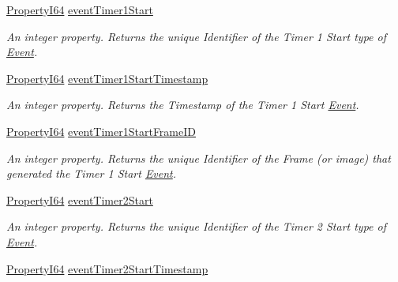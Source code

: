 \begin{DoxyCompactItemize}
\hyperlink{group___common_interface_ga81749b2696755513663492664a18a893}{Property\+I64} \hyperlink{classmv_i_m_p_a_c_t_1_1acquire_1_1_gen_i_cam_1_1_event_control_aa4a2c6fdc4028c75cc5c03682c9f6fad}{event\+Timer1\+Start}
\begin{DoxyCompactList}\small\item\em An integer property. Returns the unique Identifier of the Timer 1 Start type of \hyperlink{classmv_i_m_p_a_c_t_1_1acquire_1_1_event}{Event}. \end{DoxyCompactList}\item 
\hyperlink{group___common_interface_ga81749b2696755513663492664a18a893}{Property\+I64} \hyperlink{classmv_i_m_p_a_c_t_1_1acquire_1_1_gen_i_cam_1_1_event_control_a970e53dbe83e13b2b4c77333c2c6e790}{event\+Timer1\+Start\+Timestamp}
\begin{DoxyCompactList}\small\item\em An integer property. Returns the Timestamp of the Timer 1 Start \hyperlink{classmv_i_m_p_a_c_t_1_1acquire_1_1_event}{Event}. \end{DoxyCompactList}\item 
\hyperlink{group___common_interface_ga81749b2696755513663492664a18a893}{Property\+I64} \hyperlink{classmv_i_m_p_a_c_t_1_1acquire_1_1_gen_i_cam_1_1_event_control_a50a53d719e9803324c751e2dc0ab36e5}{event\+Timer1\+Start\+Frame\+I\+D}
\begin{DoxyCompactList}\small\item\em An integer property. Returns the unique Identifier of the Frame (or image) that generated the Timer 1 Start \hyperlink{classmv_i_m_p_a_c_t_1_1acquire_1_1_event}{Event}. \end{DoxyCompactList}\item 
\hyperlink{group___common_interface_ga81749b2696755513663492664a18a893}{Property\+I64} \hyperlink{classmv_i_m_p_a_c_t_1_1acquire_1_1_gen_i_cam_1_1_event_control_a327ff015798aee0d2e400ede19288687}{event\+Timer2\+Start}
\begin{DoxyCompactList}\small\item\em An integer property. Returns the unique Identifier of the Timer 2 Start type of \hyperlink{classmv_i_m_p_a_c_t_1_1acquire_1_1_event}{Event}. \end{DoxyCompactList}\item 
\hyperlink{group___common_interface_ga81749b2696755513663492664a18a893}{Property\+I64} \hyperlink{classmv_i_m_p_a_c_t_1_1acquire_1_1_gen_i_cam_1_1_event_control_a445ba0ba3616d22a4bbb7d24554f1cba}{event\+Timer2\+Start\+Timestamp}

\end{DoxyCompactItemize}
